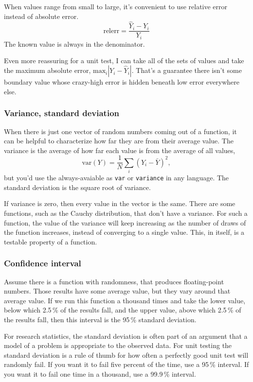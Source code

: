 \documentclass[fleqn,10pt]{olplainarticle}
\begin{document}
When values range from small to large, it's convenient to use
relative error instead of absolute error.
\begin{equation}
  \mbox{relerr} = \frac{\hat{Y}_i - Y_i}{Y_i}
\end{equation}
The known value is always in the denominator.

Even more reassuring for a unit test, I can take all of the
sets of values and take the maximum absolute error,
$\mbox{max}_i |Y_i-\hat{Y}_i|$. That's a guarantee there isn't
some boundary value whose crazy-high error is hidden beneath
low error everywhere else.

\subsubsection{Variance, standard deviation}
When there is just one vector of random numbers coming out
of a function, it can be helpful to characterize how far
they are from their average value. The variance is
the average of how far each value is from the average of all
values,
\begin{equation}
  \mbox{var}(Y) = \frac{1}{N}\sum_i (Y_i - \bar{Y})^2,
\end{equation}
but you'd use the always-avaiable
as \lstinline!var! or \lstinline!variance! in any language.
The standard deviation is the square root of variance.

If variance is zero, then every value in the vector is
the same. There are some functions, such as the Cauchy
distribution, that don't have a variance. For such a function,
the value of the variance will keep increasing as the
number of draws of the function increases, instead of
converging to a single value. This, in itself, is a
testable property of a function.


\subsubsection{Confidence interval}

Assume there is a function with randomness, that produces floating-point numbers. Those results
have some average value, but they vary around that average value.
If we run this function a thousand times and take the
lower value, below which 2.5\,\% of the results fall,
and the upper value, above which 2.5\,\% of the results fall,
then this interval is the 95\,\% standard deviation.

For research statistics, the standard deviation is often part
of an argument that a model of a problem is appropriate to
the observed data. For unit testing the standard deviation
is a rule of thumb for how often a perfectly good unit test
will randomly fail. If you want it to fail five percent of
the time, use a 95\,\% interval. If you want it to fail
one time in a thousand, use a 99.9\,\% interval.
\end{document}
